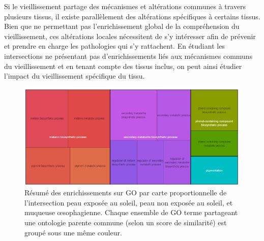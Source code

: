 Si le vieillissement partage des mécanismes et altérations communes à travers plusieurs tissus, il existe parallèlement des altérations spécifiques à certains tissus. Bien que ne permettant pas l'enrichissement global de la compréhension du vieillissement, ces altérations locales nécessitent de s'y intéresser afin de prévenir et prendre en charge les pathologies qui s'y rattachent. En étudiant les intersections ne présentant pas d'enrichissements liés aux mécanismes communs du vieillissement et en tenant compte des tissus inclus, on peut ainsi étudier l'impact du vieillissement spécifique du tissu.

\begin{figure}[b]
    \centering
    \includegraphics[width=1\textwidth]{img/chap2/chap2_revigo_resume_enrich_skin.png}
    \caption{Résumé des enrichissements sur GO par carte proportionnelle de l'intersection peau exposée au soleil, peau non exposée au soleil, et muqueuse œsophagienne. Chaque ensemble de GO terme partageant une ontologie parente commune (selon un score de similarité) est groupé sous une même couleur.}
    \label{figure:revigo_resume_melanine}
\end{figure}

